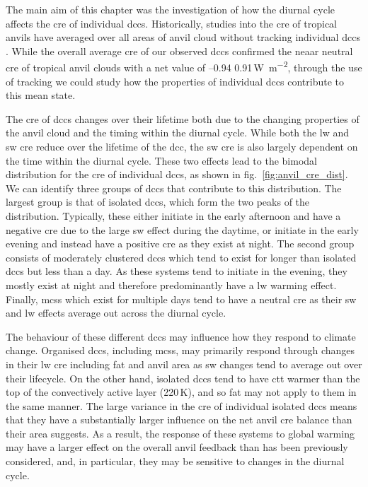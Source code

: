 The main aim of this chapter was the investigation of how the diurnal cycle affects the \acrshort{cre} of individual \acrshort{dcc}s.
Historically, studies into the \acrshort{cre} of tropical anvils have averaged over all areas of anvil cloud without tracking individual \acrshort{dcc}s \citep{ramanathan_cloud-radiative_1989, hartmann_effect_1992, stephens_cloudsat_2018}.
While the overall average \acrshort{cre} of our observed \acrshort{dcc}s confirmed the neaar neutral \acrshort{cre} of tropical anvil clouds with a net value of --0.94\,\textpm\,0.91\,\unit{W m^{-2}}, through the use of tracking we could study how the properties of individual \acrshort{dcc}s contribute to this mean state.

The \acrshort{cre} of \acrshort{dcc}s changes over their lifetime both due to the changing properties of the anvil cloud and the timing within the diurnal cycle.
While both the \acrshort{lw} and \acrshort{sw} \acrshort{cre} reduce over the lifetime of the \acrshort{dcc}, the \acrshort{sw} \acrshort{cre} is also largely dependent on the time within the diurnal cycle.
These two effects lead to the bimodal distribution for the \acrshort{cre} of individual \acrshort{dcc}s, as shown in fig.~\ref{fig:anvil_cre_dist}.
We can identify three groups of \acrshort{dcc}s that contribute to this distribution.
The largest group is that of isolated \acrshort{dcc}s, which form the two peaks of the distribution.
Typically, these either initiate in the early afternoon and have a negative \acrshort{cre} due to the large \acrshort{sw} effect during the daytime, or initiate in the early evening and instead have a positive \acrshort{cre} as they exist at night.
The second group consists of moderately clustered \acrshort{dcc}s which tend to exist for longer than isolated \acrshort{dcc}s but less than a day.
As these systems tend to initiate in the evening, they mostly exist at night and therefore predominantly have a \acrshort{lw} warming effect.
Finally, \acrshort{mcs}s which exist for multiple days tend to have a neutral \acrshort{cre} as their \acrshort{sw} and \acrshort{lw} effects average out across the diurnal cycle.

The behaviour of these different \acrshort{dcc}s may influence how they respond to climate change.
Organised \acrshort{dcc}s, including \acrshort{mcs}s, may primarily respond through changes in their \acrshort{lw} \acrshort{cre} including \acrshort{fat} and anvil area as \acrshort{sw} changes tend to average out over their lifecycle.
On the other hand, isolated \acrshort{dcc}s tend to have \acrshort{ctt} warmer than the top of the convectively active layer (220\,\unit{K}), and so \acrshort{fat} may not apply to them in the same manner.
The large variance in the \acrshort{cre} of individual isolated \acrshort{dcc}s means that they have a substantially larger influence on the net anvil \acrshort{cre} balance than their area suggests.
As a result, the response of these systems to global warming may have a larger effect on the overall anvil feedback than has been previously considered, and, in particular, they may be sensitive to changes in the diurnal cycle.


